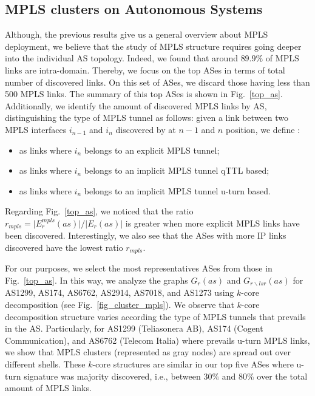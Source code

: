 \subsection{MPLS clusters on Autonomous Systems}\label{cluster.as}
Although, the previous results give us a general overview about MPLS deployment,
we believe that the study of MPLS structure requires going deeper into the
individual AS topology. Indeed, we found that around $89.9\%$ of MPLS links are
intra-domain. Thereby, we focus on the top ASes in terms of total number of
discovered links.  On this set of ASes, we discard those having less than 500
MPLS links. The summary of this top ASes is shown in
Fig.~\ref{top_as}. Additionally, we identify the amount of discovered MPLS links by AS,
distinguishing the type of MPLS tunnel as follows: given a link between two MPLS
interfaces $i_{n-1}$  and $i_{n}$ discovered by \traceroute at $n-1$ and $n$
position, we define : 
\begin{itemize}
  \item {} as links  where $i_{n}$ belongs to an explicit
  MPLS tunnel;
  \item {} as links  where $i_{n}$ belongs  to an implicit
  MPLS tunnel qTTL based;
  \item {} as links where $i_{n}$ belongs to an
  implicit MPLS tunnel u-turn based.
\end{itemize}

Regarding Fig.~\ref{top_as}, we noticed that the ratio $r_{mpls}= \vert E^{mpls}_{r} (as)
\vert /\vert E_{r} (as) \vert $ is greater when more explicit MPLS links have
been discovered. Interestingly, we also see that the ASes with more IP links
discovered have the lowest ratio $r_{mpls}$. 

For our purposes, we select the most representatives ASes from those in
Fig.~\ref{top_as}. In this way, we analyze the graphs $G_{r}(as)$ and
$G_{r\backslash lsr}(as)$ for AS1299, AS174, AS6762, AS2914, AS7018, and AS1273
using $k$-core decomposition (see Fig.~\ref{fig_cluster_mpls}). We observe that
$k$-core decomposition structure varies according the type of MPLS tunnels that
prevails in the AS. Particularly, for  AS1299 (Teliasonera AB), AS174 (Cogent
Communication), and AS6762 (Telecom Italia) where prevails u-turn MPLS links, we
show that MPLS clusters (represented as gray nodes) are spread out over
different shells. These $k$-core structures are similar in our top five ASes
where u-turn signature was majority discovered, i.e., between $30\%$ and $80\%$
over the total amount of MPLS links.

